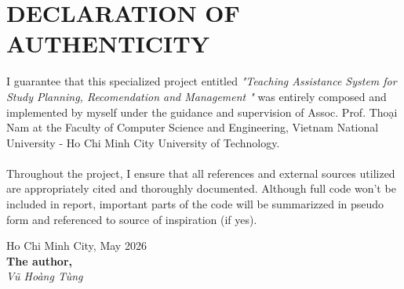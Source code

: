 \section*{DECLARATION OF AUTHENTICITY}
\thispagestyle{empty}

I guarantee that this specialized project entitled \textit{"Teaching Assistance System for Study Planning, Recomendation and Management "} was entirely composed and implemented by myself under the guidance and supervision of Assoc. Prof. Thoại Nam at the Faculty of Computer Science and Engineering, Vietnam National University - Ho Chi Minh City University of Technology.
\\\\Throughout the project, I ensure that all references and external sources utilized are appropriately cited and thoroughly documented. Although full code won't be included in report, important parts of the code will be summarizzed in pseudo form and referenced to source of inspiration (if yes).

\vspace{2cm}

\begin{flushright}
Ho Chi Minh City, May 2026 \\
\textbf{The author,} \\[0.5cm]
\textit{Vũ Hoàng Tùng}
\end{flushright}
\clearpage
{}
